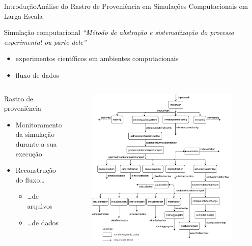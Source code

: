 \documentclass[12pt,compress,final]{beamer}
\newcommand{\nologo}{\setbeamertemplate{logo}{}} %
\begin{document}
{\nologo
\begin{frame}{Introdução}{Análise do \alert{Rastro de Proveniência} em \alert{Simulações Computacionais} em Larga Escala}

    \begin{alertblock}{Simulação computacional}
    \textit{``Método de abstração e sistematização do processo experimental ou parte dele''}
    \smallskip
    \begin{itemize}
        \item experimentos científicos em ambientes computacionais
        \item fluxo de dados
    \end{itemize}
    \end{alertblock}
    
    \begin{columns}
    \begin{block}{Rastro de proveniência}
    \begin{itemize}
        \item Monitoramento da simulação durante a sua execução
        \item Reconstrução do fluxo\ldots{}
        \begin{itemize}
            \item \ldots{}de arquivos %
            \item \ldots{}de dados %
        \end{itemize}
    \end{itemize}
    \end{block}
    \begin{figure}
    \includegraphics[width=.9\textwidth]{img/experiments-dataflow.pdf}
    \end{figure}
    \end{columns}
    
\end{frame}
}
\end{document}
